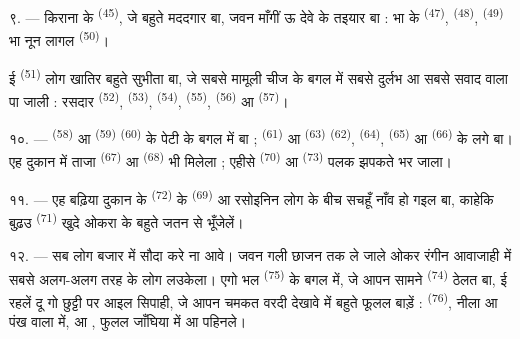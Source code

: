 ९. --- किराना के  \textsuperscript{(45)}, जे बहुते मददगार
बा, जवन माँगीं ऊ देवे के तइयार बा :  भा  के
 \textsuperscript{(47)},  \textsuperscript{(48)},
 \textsuperscript{(49)} भा नून लागल 
\textsuperscript{(50)}।

ई  \textsuperscript{(51)} लोग खातिर बहुते सुभीता बा, जे
सबसे मामूली चीज के बगल में सबसे दुर्लभ  आ सबसे सवाद
वाला  पा जाली : रसदार  \textsuperscript{(52)},
 \textsuperscript{(53)},  \textsuperscript{(54)},
 \textsuperscript{(55)},  \textsuperscript{(56)}
आ  \textsuperscript{(57)}।

\VUsaut{4.0mm}
\VUsaut{3.0mm}

१०. ---  \textsuperscript{(58)} आ 
\textsuperscript{(59)}  \textsuperscript{(60)} के पेटी
के बगल में बा ;  \textsuperscript{(61)} आ 
\textsuperscript{(63)}  \textsuperscript{(62)}, 
\textsuperscript{(64)},  \textsuperscript{(65)} आ
 \textsuperscript{(66)} के लगे बा। एह दुकान में ताजा
 \textsuperscript{(67)} आ  \textsuperscript{(68)}
भी मिलेला ; एहीसे  \textsuperscript{(70)} आ  \textsuperscript{(73)} पलक झपकते भर जाला।

११. --- एह बढ़िया दुकान के  \textsuperscript{(72)}
के  \textsuperscript{(69)} आ रसोइनिन लोग के बीच सचहूँ नाँव
हो गइल बा, काहेकि बुढ़उ  \textsuperscript{(71)} खुदे
ओकरा के बहुते जतन से भूँजेलें।

\VUsaut{4.0mm}
\VUsaut{3.0mm}

१२. --- सब लोग बजार में सौदा करे ना आवे। जवन गली छाजन तक ले जाले ओकर
रंगीन आवाजाही में सबसे अलग-अलग तरह के लोग लउकेला। एगो भल
 \textsuperscript{(75)} के बगल में, जे आपन
सामने  \textsuperscript{(74)} ठेलत बा, ई रहलें दू गो छुट्टी पर
आइल सिपाही, जे आपन चमकत वरदी देखावे में बहुते फूलल बाड़ें :
 \textsuperscript{(76)}, नीला  आ पंख वाला
 में, आ , फुलल जाँघिया में आ
 पहिनले।

